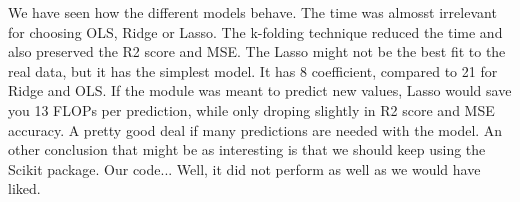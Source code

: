 We have seen how the different models behave. The time was almosst irrelevant for choosing
OLS, Ridge or Lasso. The k-folding technique reduced the time and also preserved the R2 score and MSE.
The Lasso might not be the best fit to the real data, but it has the simplest model.
It has 8 coefficient, compared to 21 for Ridge and OLS. If the module was meant to predict
new values, Lasso would save you 13 FLOPs per prediction, while only droping slightly in R2
score and MSE accuracy. A pretty good deal if many predictions are needed with the model. An other conclusion
that might be as interesting is that we should keep using the Scikit package. Our code...
Well, it did not perform as well as we would have liked.
\\
\\
\\
\\
\\
\\
\\
\\
\\
\\
\\
\\
\\
\\
\\
\\
\\
\\
\\
\\
